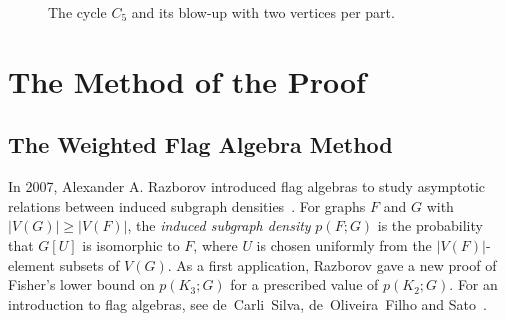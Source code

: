 \documentclass[preprint,11pt,numbers]{elsarticle-arxiv}
\numberwithin{equation}{section}
\theoremstyle{definition}
\begin{document}
\begin{figure}[!htbp]
\centering
{}
\caption{The cycle $C_5$ and its blow-up with two vertices per part.}
\label{fig:blowup}
\end{figure}

\relax\space%

\section{The Method of the Proof}\label{sec:overview}

\subsection{The Weighted Flag Algebra Method}\label{subsec:weighted-sketch}

In 2007, Alexander A. Razborov introduced flag algebras to study
asymptotic relations between induced subgraph densities~\cite{Razborov2007}.
For graphs $F$ and $G$ with $|V(G)|\geq |V(F)|$, the
\emph{induced subgraph density} $p(F;G)$ is the probability that
$G[U]$ is isomorphic to $F$, where $U$ is chosen uniformly from
the $|V(F)|$-element subsets of $V(G)$. As a first application,
Razborov gave a new proof of Fisher's lower bound on $p(K_3;G)$
for a prescribed value of $p(K_2;G)$. For an introduction to flag algebras, see
de~Carli~Silva, de~Oliveira~Filho and Sato~\cite{CarliSilvaOliveiraSato2016}.
\end{document}

